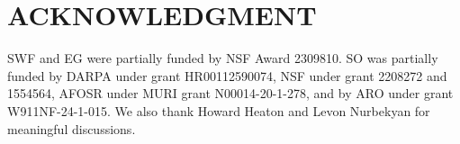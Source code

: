 \documentclass[letterpaper, 10 pt, conference]{ieeeconf}  %
\begin{document}


\section*{ACKNOWLEDGMENT}
SWF and EG were partially funded by NSF Award 2309810. SO was partially funded by DARPA under grant HR00112590074, NSF under grant 2208272 and 1554564, AFOSR under MURI grant N00014-20-1-278, and by ARO under grant W911NF-24-1-015. We also thank Howard Heaton and Levon Nurbekyan for meaningful discussions.









\end{document}
